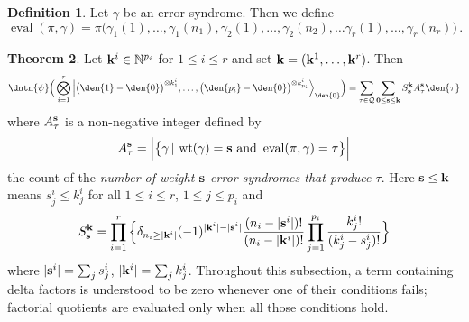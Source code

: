 \documentclass[english,letter paper,12pt,reqno]{article}
\theoremstyle{definition}
\newtheorem{theorem}{Theorem}[section]
\newtheorem{definition}[theorem]{Definition}
\def\be{\begin{equation}}
\def\ee{\end{equation}}
\def\l{\,|\,}
\begin{document}
\begin{definition}\label{defn:eval_error_syndrome}
Let $\gamma$ be an error syndrome. Then we define
\be\label{eq:eval_pi_gamma}
\operatorname{eval}(\pi, \gamma) = \pi\Big( \gamma_1(1), \ldots, \gamma_1(n_1),
\gamma_2(1), \ldots, \gamma_2(n_2), \ldots
\gamma_r(1), \ldots, \gamma_r(n_r)\Big)\,.
\ee
\end{definition}

\begin{theorem}\label{theorem:main_error_syndrome_general} Let $\bold{k}^i \in \mathbb{N}^{p_i}$ for $1 \le i \le r$ and set $\bold{k} = (\bold{k}^1,\ldots,\bold{k}^r)$. Then
\be\label{eq:main_comp1}
\dntn{\psi}\Big( \bigotimes_{i=1}^r \Big| \big(\den{1} - \den{0}\big)^{\otimes k^i_1}, \ldots, \big(\den{p_i} - \den{0}\big)^{\otimes k^i_{p_i}} \Big\rangle_{\den{0}} \Big) = \sum_{\tau \in \mathcal{Q}} \sum_{\bold{0} \le \bold{s} \le \bold{k}} S^{\bold{k}}_{\bold{s}} A^{\bold{s}}_\tau  \den{\tau}
\ee
where $A^{\bold{s}}_\tau$ is a non-negative integer defined by
\be\label{eq:defn_A_s_tau}
A^{\bold{s}}_\tau = \Big| \big\{ \gamma \l \operatorname{wt}(\gamma) = \bold{s} \text{ and } \operatorname{eval}(\pi, \gamma) = \tau \big\} \Big|
\ee
the count of the \emph{number of weight $\bold{s}$ error syndromes that produce $\tau$}. Here $\bold{s} \le \bold{k}$ means $s^i_j \le k^i_j$ for all $1 \le i \le r$, $1 \le j \le p_i$ and
\be\label{eq:s_coeff_theorem}
S^{\bold{k}}_{\bold{s}} = \prod_{i=1}^r \Big\{ \delta_{n_i \ge |\bold{k}^i|} (-1)^{|\bold{k}^i| - |\bold{s}^i|} \frac{(n_i-|\bold{s}^i|)!}{(n_i-|\bold{k}^i|)!} \prod_{j=1}^{p_i} \frac{k^i_j!}{(k^i_j - s^i_j)!} \Big\}
\ee
where $|\bold{s}^i| = \sum_j s^i_j$, $|\bold{k}^i| = \sum_j k^i_j$. Throughout this subsection, a term containing delta factors is understood to be zero whenever one of their conditions fails; factorial quotients are evaluated only when all those conditions hold.
\end{theorem}
\end{document}
